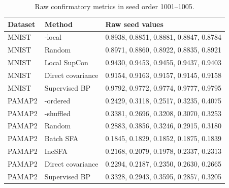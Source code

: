 \begin{table}[H]
\centering
\small
\caption{Raw confirmatory metrics in seed order 1001--1005.}
\label{tab:raw-confirmatory}
\begin{tabular}{lll}
\toprule
Dataset & Method & Raw seed values \\
\midrule
MNIST & \TeReL{}-local & 0.8938, 0.8851, 0.8881, 0.8847, 0.8784 \\
MNIST & Random & 0.8971, 0.8860, 0.8922, 0.8835, 0.8921 \\
MNIST & Local SupCon & 0.9430, 0.9453, 0.9455, 0.9437, 0.9403 \\
MNIST & Direct covariance & 0.9154, 0.9163, 0.9157, 0.9145, 0.9158 \\
MNIST & Supervised BP & 0.9792, 0.9772, 0.9774, 0.9777, 0.9795 \\
PAMAP2 & \TeReL{}-ordered & 0.2429, 0.3118, 0.2517, 0.3235, 0.4075 \\
PAMAP2 & \TeReL{}-shuffled & 0.3381, 0.2696, 0.3208, 0.3070, 0.3253 \\
PAMAP2 & Random & 0.2883, 0.3856, 0.3246, 0.2915, 0.3180 \\
PAMAP2 & Batch SFA & 0.1845, 0.1829, 0.1852, 0.1875, 0.1839 \\
PAMAP2 & IncSFA & 0.2168, 0.2079, 0.1978, 0.2337, 0.2313 \\
PAMAP2 & Direct covariance & 0.2294, 0.2187, 0.2350, 0.2630, 0.2665 \\
PAMAP2 & Supervised BP & 0.3328, 0.2943, 0.3595, 0.2857, 0.3205 \\
\bottomrule
\end{tabular}
\end{table}
